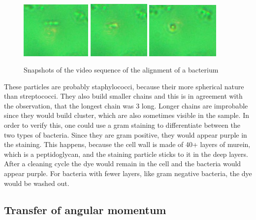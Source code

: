 \documentclass[12pt,english]{scrartcl}
\begin{document}
\begin{figure}[H]
	\centering
	\includegraphics[width=0.31\textwidth]{figures/lebewesen_1.JPG}
	\includegraphics[width=0.27\textwidth]{figures/lebewesen_2.JPG}
	\includegraphics[width=0.32\textwidth]{figures/lebewesen_3.JPG}
	\caption[Snapshots of the video sequence of the alignment of a bacterium
	]{Snapshots of the video sequence of the alignment of a bacterium
	}\label{fig:bacterium}
\end{figure}

These particles are probably staphylococci, because their more spherical nature
than streptococci. They also build smaller chains and this is in agreement with
the observation, that the longest chain was 3 long. Longer chains are
improbable since they would build cluster, which are also sometimes visible in
the sample.\cite{Bakterienformen} In order to verify this, one could use a gram
staining to differentiate between the two types of bacteria. Since they are
gram positive, they would appear purple in the staining. This happens, because
the cell wall is made of 40+ layers of murein, which is a peptidoglycan, and
the staining particle sticks to it in the deep layers. After a cleaning cycle
the dye would remain in the cell and the bacteria would appear purple. For
bacteria with fewer layers, like gram negative bacteria, the dye would be
washed out.\cite{ghazalMicrobiologicalHygenicDiscussion2024}


\subsection{Transfer of angular momentum}\label{sec:AuswertungAngularMomentum}
\end{document}
